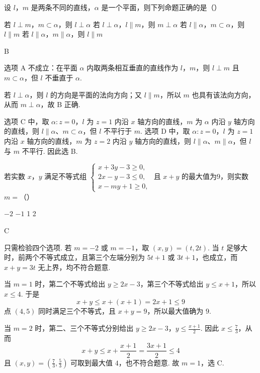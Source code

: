 \begin{problem}
设 \(l\)，\(m\) 是两条不同的直线，\(\alpha\) 是一个平面，则下列命题正确的是（\quad）

\choices
    {若 \(l \perp m\)，\(m \subset \alpha\)，则 \(l \perp \alpha\)}
    {若 \(l \perp \alpha\)，\(l \parallel m\)，则 \(m \perp \alpha\)}
    {若 \(l \parallel \alpha\)，\(m \subset \alpha\)，则 \(l \parallel m\)}
    {若 \(l \parallel \alpha\)，\(m \parallel \alpha\)，则 \(l \parallel m\)}
\begin{answer}
B
\end{answer}

\begin{solution}
选项 A 不成立：在平面 \(\alpha\) 内取两条相互垂直的直线作为 \(l\)，\(m\)，则 \(l\perp m\) 且 \(m\subset\alpha\)，但 \(l\) 不垂直于 \(\alpha\).

若 \(l\perp\alpha\)，则 \(l\) 的方向是平面的法向方向；又 \(l\parallel m\)，所以 \(m\) 也具有该法向方向，从而 \(m\perp\alpha\)，故 B 正确.

选项 C 中，取 \(\alpha:z=0\)，\(l\) 为 \(z=1\) 内沿 \(x\) 轴方向的直线，\(m\) 为 \(\alpha\) 内沿 \(y\) 轴方向的直线，则 \(l\parallel\alpha\)、\(m\subset\alpha\)，但 \(l\) 不平行于 \(m\). 选项 D 中，取 \(\alpha:z=0\)，\(l\) 为 \(z=1\) 内沿 \(x\) 轴方向的直线，\(m\) 为 \(z=2\) 内沿 \(y\) 轴方向的直线，则 \(l\parallel\alpha\)、\(m\parallel\alpha\)，但 \(l\) 与 \(m\) 不平行. 因此选 B.
\end{solution}
\end{problem}

\begin{problem}
若实数 \(x\)，\(y\) 满足不等式组 \(\begin{cases}
x + 3y - 3 \geqslant 0,\\
2x - y - 3 \leqslant 0,\\
x - my + 1 \geqslant 0,
\end{cases}\) 且 \(x + y\) 的最大值为\(9\)，则实数 \(m =\)（\quad）

\choices
    {\(-2\)}
    {\(-1\)}
    {1}
    {2}
\begin{answer}
C
\end{answer}

\begin{solution}
只需检验四个选项. 若 \(m=-2\) 或 \(m=-1\)，取 \((x,y)=(t,2t)\). 当 \(t\) 足够大时，前两个不等式成立，且第三个左端分别为 \(5t+1\) 或 \(3t+1\)，也成立，而 \(x+y=3t\) 无上界，均不符合题意.

当 \(m=1\) 时，第二个不等式给出 \(y\geqslant2x-3\)，第三个不等式给出 \(y\leqslant x+1\)，所以 \(x\leqslant4\). 于是
\[
x+y\leqslant x+(x+1)=2x+1\leqslant9
\]
点 \((4,5)\) 同时满足三个不等式，且 \(x+y=9\)，所以最大值确为 \(9\).

当 \(m=2\) 时，第二、三个不等式分别给出
\(y\geqslant2x-3\)，\(y\leqslant\frac{x+1}{2}\).
因此 \(x\leqslant\frac73\)，从而
\[
x+y\leqslant x+\frac{x+1}{2}=\frac{3x+1}{2}\leqslant4
\]
且 \((x,y)=(\frac73,\frac53)\) 可取到最大值 \(4\)，也不符合题意. 故 \(m=1\)，选 C.
\end{solution}
\end{problem}

